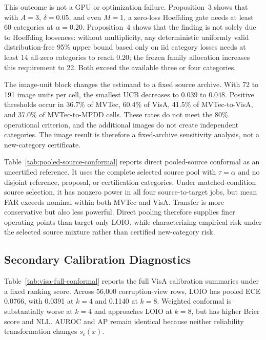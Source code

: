 This outcome is not a GPU or optimization failure. Proposition~3 shows that with $A=3$, $\delta=0.05$, and even $M=1$, a zero-loss Hoeffding gate needs at least 60 categories at $\alpha=0.20$. Proposition~4 shows that the finding is not solely due to Hoeffding looseness: without multiplicity, any deterministic uniformly valid distribution-free 95\% upper bound based only on iid category losses needs at least 14 all-zero categories to reach 0.20; the frozen family allocation increases this requirement to 22. Both exceed the available three or four categories.

The image-unit block changes the estimand to a fixed source archive. With 72 to 191 image units per cell, the smallest UCB decreases to 0.039 to 0.048. Positive thresholds occur in 36.7\% of MVTec, 60.4\% of VisA, 41.5\% of MVTec-to-VisA, and 37.0\% of MVTec-to-MPDD cells. These rates do not meet the 80\% operational criterion, and the additional images do not create independent categories. The image result is therefore a fixed-archive sensitivity analysis, not a new-category certificate.

Table~\ref{tab:pooled-source-conformal} reports direct pooled-source conformal as an uncertified reference. It uses the complete selected source pool with $\tau=\alpha$ and no disjoint reference, proposal, or certification categories. Under matched-condition source selection, it has nonzero power in all four source-to-target jobs, but mean FAR exceeds nominal within both MVTec and VisA. Transfer is more conservative but also less powerful. Direct pooling therefore supplies finer operating points than target-only LOIO, while characterizing empirical risk under the selected source mixture rather than certified new-category risk.

\subsection{Secondary Calibration Diagnostics}\label{sec:corruption-reliability}


Table~\ref{tab:visa-full-conformal} reports the full VisA calibration summaries under a fixed ranking score. Across 56{,}000 corruption-view rows, LOIO has pooled ECE 0.0766, with 0.0391 at $k=4$ and 0.1140 at $k=8$. Weighted conformal is substantially worse at $k=4$ and approaches LOIO at $k=8$, but has higher Brier score and NLL. AUROC and AP remain identical because neither reliability transformation changes $s_c(x)$.

